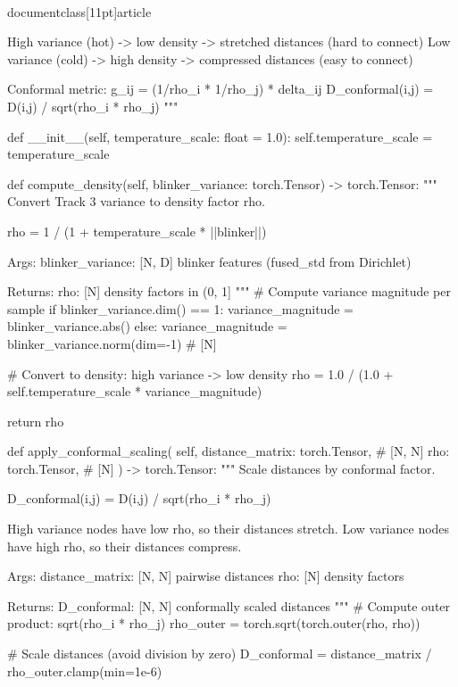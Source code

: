 \\documentclass[11pt]{article}
\begin{document}
\begin{CodeBlock}
    High variance (hot) -> low density -> stretched distances (hard to connect)
    Low variance (cold) -> high density -> compressed distances (easy to connect)

    Conformal metric:
        g_ij = (1/rho_i * 1/rho_j) * delta_ij
        D_conformal(i,j) = D(i,j) / sqrt(rho_i * rho_j)
    """

    def __init__(self, temperature_scale: float = 1.0):
        self.temperature_scale = temperature_scale

    def compute_density(self, blinker_variance: torch.Tensor) -> torch.Tensor:
        """
        Convert Track 3 variance to density factor rho.

        rho = 1 / (1 + temperature_scale * ||blinker||)

        Args:
            blinker_variance: [N, D] blinker features (fused_std from Dirichlet)

        Returns:
            rho: [N] density factors in (0, 1]
        """
        # Compute variance magnitude per sample
        if blinker_variance.dim() == 1:
            variance_magnitude = blinker_variance.abs()
        else:
            variance_magnitude = blinker_variance.norm(dim=-1)  # [N]

        # Convert to density: high variance -> low density
        rho = 1.0 / (1.0 + self.temperature_scale * variance_magnitude)

        return rho

    def apply_conformal_scaling(
        self,
        distance_matrix: torch.Tensor,  # [N, N]
        rho: torch.Tensor,               # [N]
    ) -> torch.Tensor:
        """
        Scale distances by conformal factor.

        D_conformal(i,j) = D(i,j) / sqrt(rho_i * rho_j)

        High variance nodes have low rho, so their distances stretch.
        Low variance nodes have high rho, so their distances compress.

        Args:
            distance_matrix: [N, N] pairwise distances
            rho: [N] density factors

        Returns:
            D_conformal: [N, N] conformally scaled distances
        """
        # Compute outer product: sqrt(rho_i * rho_j)
        rho_outer = torch.sqrt(torch.outer(rho, rho))

        # Scale distances (avoid division by zero)
        D_conformal = distance_matrix / rho_outer.clamp(min=1e-6)


\end{CodeBlock}
\end{document}
